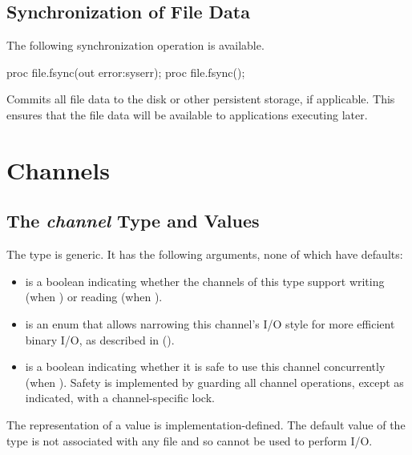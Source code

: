 \subsection{Synchronization of File Data}
\label{IO_file_synchronization}

The following synchronization operation is available.

\begin{protohead}
proc file.fsync(out error:syserr);
proc file.fsync();
\end{protohead}
\begin{protobody}
Commits all file data to the disk or other persistent storage, if
applicable. This ensures that the file data will be available to
applications executing later.
\end{protobody}


\section{Channels}
\label{IO_channels}


\subsection{The {\em channel} Type and Values}
\label{IO_channel_type}

The  type is generic. It has the following arguments,
none of which have defaults:

\begin{itemize}

\item {} is a boolean indicating whether the channels of this type
      support writing (when ) or reading (when ).

\item {} is an enum  that allows narrowing
      this channel's I/O style for more efficient binary I/O,
      as described in ().

\item {} is a boolean indicating whether it is
      safe to use this channel concurrently (when ).
      Safety is implemented by guarding all channel operations, except
      as indicated, with a channel-specific lock.

\end{itemize}

The representation of a  value is implementation-defined.
The default value of the  type is not associated
with any file and so cannot be used to perform I/O.


